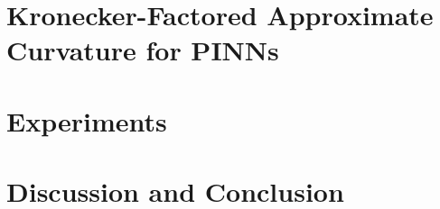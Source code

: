 \documentclass{article}
\begin{document}
\section{Kronecker-Factored Approximate Curvature for
PINNs}\label{sec:kfac_pinns}




\section{Experiments}\label{sec:experiments}



\section{Discussion and Conclusion}\label{sec:conclusion}







\clearpage
\appendix




\end{document}
